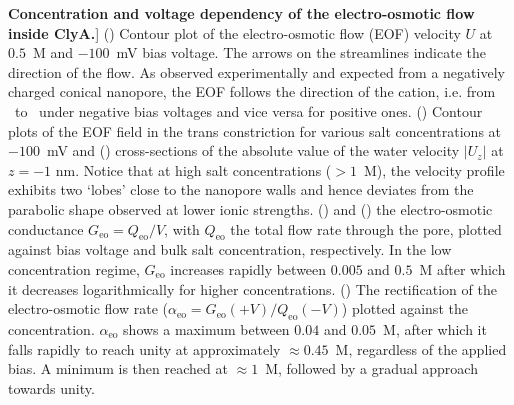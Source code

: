 \begin{figure*}[htbp]
\caption
[\textbf{Concentration and voltage dependency of the electro-osmotic flow inside ClyA.}]
{
()
Contour plot of the electro-osmotic flow (EOF) velocity $U$ at $0.5$~M and $-100$~mV bias voltage. The arrows 
on the streamlines indicate the direction of the flow. As observed experimentally\cite{soskine2013} and 
expected from a negatively charged conical nanopore, the EOF follows the direction of the cation, i.e. from 
\cis\ to \trans\ under negative bias voltages and vice versa for positive ones.
()
Contour plots of the EOF field in the trans constriction for various salt concentrations at $-100$~mV and
()
cross-sections of the absolute value of the water velocity $\left|U_z\right|$ at $z=-1\text{~nm}$. Notice 
that at high salt concentrations ($>1$~M), the velocity profile exhibits two `lobes' close to the nanopore 
walls and hence deviates from the parabolic shape observed at lower ionic strengths.
() and () the 
electro-osmotic conductance $G_\text{eo} = Q_\text{eo}/V$, with $Q_\text{eo}$ the total flow rate through
the pore, plotted against bias voltage and bulk salt concentration, respectively. In the low concentration 
regime, $G_\text{eo}$ increases rapidly between $0.005$ and $0.5$~M after which it decreases logarithmically 
for higher concentrations.
()
The rectification of the electro-osmotic flow rate ($\alpha_\text{eo} = G_\text{eo}(+V)/Q_\text{eo}(-V)$) 
plotted against the concentration. $\alpha_\text{eo}$ shows a maximum between $0.04$ and $0.05$~M, after 
which it falls rapidly to reach unity at approximately $\approx0.45$~M, regardless of the applied bias. A 
minimum is then reached at $\approx1$~M, followed by a gradual approach towards unity.
}

\label{fig:flow}

\end{figure*}